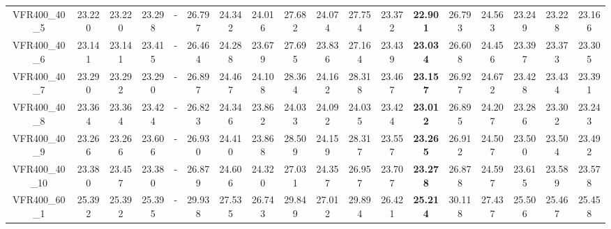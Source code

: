 \begin{tabular}{cc|ccc|ccccccccccccc}
VFR400\_40\_5      & 23.220           & 23.220           & 23.298           & -                & 26.797           & 24.342           & 24.016           & 27.682           & 24.074           & 27.754           & 23.372           & {\bf 22.901}     & 26.793           & 24.563           & 23.249           & 23.228           & 23.166          \\ 
VFR400\_40\_6      & 23.141           & 23.141           & 23.415           & -                & 26.464           & 24.288           & 23.679           & 27.695           & 23.836           & 27.164           & 23.439           & {\bf 23.034}     & 26.608           & 24.456           & 23.397           & 23.373           & 23.305          \\ 
VFR400\_40\_7      & 23.290           & 23.292           & 23.290           & -                & 26.897           & 24.467           & 24.108           & 28.364           & 24.162           & 28.318           & 23.467           & {\bf 23.157}     & 26.927           & 24.672           & 23.428           & 23.434           & 23.391          \\ 
VFR400\_40\_8      & 23.364           & 23.364           & 23.424           & -                & 26.823           & 24.346           & 23.862           & 24.033           & 24.092           & 24.035           & 23.424           & {\bf 23.012}     & 26.895           & 24.207           & 23.286           & 23.302           & 23.243          \\ 
VFR400\_40\_9      & 23.266           & 23.266           & 23.606           & -                & 26.930           & 24.410           & 23.868           & 28.509           & 24.159           & 28.317           & 23.557           & {\bf 23.265}     & 26.912           & 24.507           & 23.500           & 23.504           & 23.492          \\ 
VFR400\_40\_10     & 23.380           & 23.457           & 23.380           & -                & 26.879           & 24.606           & 24.320           & 27.031           & 24.357           & 26.957           & 23.707           & {\bf 23.278}     & 26.878           & 24.597           & 23.615           & 23.589           & 23.578          \\ 
VFR400\_60\_1      & 25.392           & 25.392           & 25.395           & -                & 29.938           & 27.535           & 26.743           & 29.849           & 27.012           & 29.894           & 26.421           & {\bf 25.214}     & 30.118           & 27.437           & 25.506           & 25.467           & 25.458          \\ 

\end{tabular}
